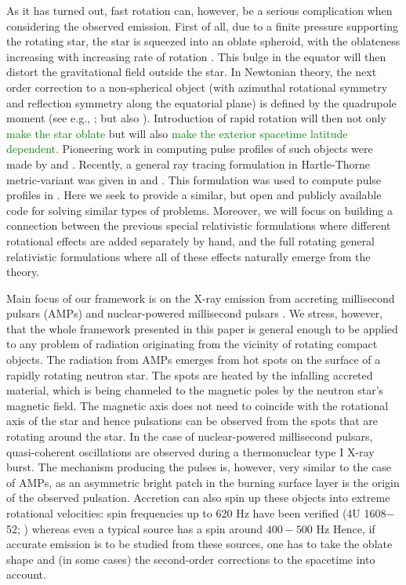 \documentclass{aa}
\newcommand{\refe}[1]{\textcolor{green}{{#1}}}
\newcommand{\refedel}[1]{}
\begin{document}
As it has turned out, fast rotation can, however, be a serious complication when considering the observed emission.
First of all, due to a finite pressure supporting the rotating star, the star is squeezed into an oblate spheroid, with the oblateness increasing with increasing rate of rotation \citep{CST94, MS99, MLC07, BBP13, aGM14}.
This bulge in the equator will then distort the gravitational field outside the star.
In Newtonian theory, the next order correction to a non-spherical object (with azimuthal rotational symmetry and reflection symmetry along the equatorial plane) is defined by the quadrupole moment (see e.g., \citealt{LP99}; but also \citealt{PA12}).
Introduction of rapid rotation will then not only\refedel{ break the spherical symmetry of the object} \refe{make the star oblate} but will also \refe{make the exterior spacetime latitude dependent.}
Pioneering work in computing pulse profiles of such objects were made by \citet{CL05} and \citet{CML07}.
Recently, a general ray tracing formulation in Hartle-Thorne metric-variant was given in \citet{PJ12} and \citet{BPO12}. 
This formulation was used to compute pulse profiles in \citet{PO14}.
Here we seek to provide a similar, but open and publicly available code for solving similar types of problems.
Moreover, we will focus on building a connection between the previous special relativistic formulations where different rotational effects are added separately by hand, and the full rotating general relativistic formulations where all of these effects naturally emerge from the theory.


Main focus of our framework is on the X-ray emission from accreting millisecond pulsars (AMPs) \citep{WvdK98, PW12} and nuclear-powered millisecond pulsars \citep{Watts12}.
We stress, however, that the whole framework presented in this paper is general enough to be applied to any problem of radiation originating from the vicinity of rotating compact objects. 
The radiation from AMPs emerges from hot spots on the surface of a rapidly rotating neutron star. The spots are heated by the infalling accreted material, which is being channeled to the magnetic poles by the neutron star's magnetic field.
The magnetic axis does not need to coincide with the rotational axis of the star and hence pulsations can be observed from the spots that are rotating around the star.
In the case of nuclear-powered millisecond pulsars, quasi-coherent oscillations are observed during a thermonuclear type I X-ray burst.
The mechanism producing the pulses is, however, very similar to the case of AMPs, as an asymmetric bright patch in the burning surface layer is the origin of the observed pulsation.
Accretion can also spin up these objects into extreme rotational velocities: spin frequencies up to 620 Hz have been verified (4U 1608$-$52; \citealt{MC02}) whereas even a typical source has a spin around $400-500$ Hz \citep{Watts12, PTR14}
Hence, if accurate emission is to be studied from these sources, one has to take the oblate shape and (in some cases) the second-order corrections to the spacetime into account.
\end{document}
